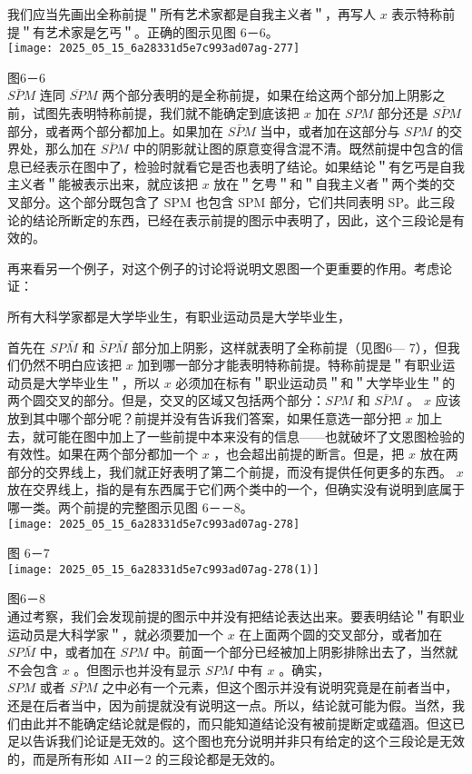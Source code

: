 我们应当先画出全称前提＂所有艺术家都是自我主义者＂，再写人 $x$ 表示特称前提＂有艺术家是乞丐＂。正确的图示见图 6－6。\\
\texttt{[image: 2025\_05\_15\_6a28331d5e7c993ad07ag-277]}

图6－6\\
$S \bar{P} M$ 连同 $\overline{S P} M$ 两个部分表明的是全称前提，如果在给这两个部分加上阴影之前，试图先表明特称前提，我们就不能确定到底该把 $x$ 加在 $S P M$ 部分还是 $S \bar{P} M$ 部分，或者两个部分都加上。如果加在 $S \bar{P} M$ 当中，或者加在这部分与 $S P M$ 的交界处，那么加在 $S \bar{P} M$ 中的阴影就让图的原意变得含混不清。既然前提中包含的信息已经表示在图中了，检验时就看它是否也表明了结论。如果结论＂有乞丐是自我主义者＂能被表示出来，就应该把 $x$ 放在＂乞甹＂和＂自我主义者＂两个类的交叉部分。这个部分既包含了 SPM 也包含 SPM 部分，它们共同表明 SP。此三段论的结论所断定的东西，已经在表示前提的图示中表明了，因此，这个三段论是有效的。

再来看另一个例子，对这个例子的讨论将说明文恩图一个更重要的作用。考虑论证：

\begin{displayquote}
所有大科学家都是大学毕业生，有职业运动员是大学毕业生，
\end{displayquote}

首先在 $S P \bar{M}$ 和 $\bar{S} P \bar{M}$ 部分加上阴影，这样就表明了全称前提（见图6— 7），但我们仍然不明白应该把 $x$ 加到哪一部分才能表明特称前提。特称前提是＂有职业运动员是大学毕业生＂，所以 $x$ 必须加在标有＂职业运动员＂和＂大学毕业生＂的两个圆交叉的部分。但是，交叉的区域又包括两个部分：$S P M$ 和 $S \bar{P} M$ 。 $x$ 应该放到其中哪个部分呢？前提并没有告诉我们答案，如果任意选一部分把 $x$ 加上去，就可能在图中加上了一些前提中本来没有的信息——也就破坏了文恩图检验的有效性。如果在两个部分都加一个 $x$ ，也会超出前提的断言。但是，把 $x$ 放在两部分的交界线上，我们就正好表明了第二个前提，而没有提供任何更多的东西。 $x$ 放在交界线上，指的是有东西属于它们两个类中的一个，但确实没有说明到底属于哪一类。两个前提的完整图示见图 6－－8。\\
\texttt{[image: 2025\_05\_15\_6a28331d5e7c993ad07ag-278]}

图 6－7\\
\texttt{[image: 2025\_05\_15\_6a28331d5e7c993ad07ag-278(1)]}

图6－8\\
通过考察，我们会发现前提的图示中并没有把结论表达出来。要表明结论＂有职业运动员是大科学家＂，就必须要加一个 $x$ 在上面两个圆的交叉部分，或者加在 $S P \bar{M}$ 中，或者加在 $S P M$ 中。前面一个部分已经被加上阴影排除出去了，当然就不会包含 $x$ 。但图示也并没有显示 $S P M$ 中有 $x$ 。确实，\\
$S P M$ 或者 $S \bar{P} M$ 之中必有一个元素，但这个图示并没有说明究竟是在前者当中，还是在后者当中，因为前提就没有说明这一点。所以，结论就可能为假。当然，我们由此并不能确定结论就是假的，而只能知道结论没有被前提断定或蕴涵。但这已足以告诉我们论证是无效的。这个图也充分说明并非只有给定的这个三段论是无效的，而是所有形如 AII－2 的三段论都是无效的。

